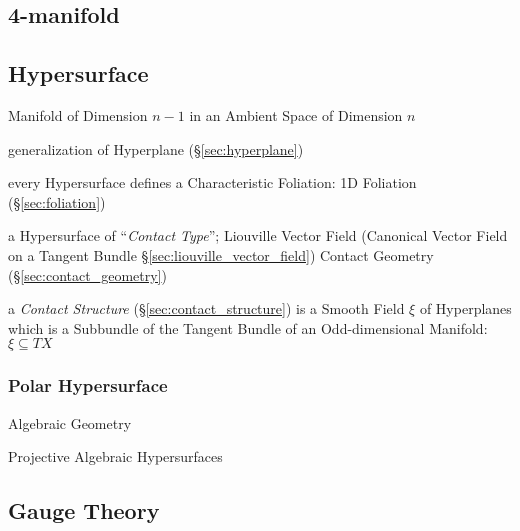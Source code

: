 \subsection{4-manifold}\label{sec:four_manifold}

\subsection{Hypersurface}\label{sec:hypersurface}


Manifold of Dimension $n-1$ in an Ambient Space of Dimension $n$

generalization of Hyperplane (\S\ref{sec:hyperplane})

every Hypersurface defines a Characteristic Foliation: 1D Foliation
(\S\ref{sec:foliation})

a Hypersurface of ``\emph{Contact Type}''; Liouville Vector Field (Canonical
Vector Field on a Tangent Bundle \S\ref{sec:liouville_vector_field}) \fist
Contact Geometry (\S\ref{sec:contact_geometry})

a \emph{Contact Structure} (\S\ref{sec:contact_structure}) is a Smooth Field
$\xi$ of Hyperplanes which is a Subbundle of the Tangent Bundle of an
Odd-dimensional Manifold: $\xi \subseteq T X$




\subsubsection{Polar Hypersurface}\label{sec:polar_hypersurface}

Algebraic Geometry

Projective Algebraic Hypersurfaces




\subsection{Gauge Theory}\label{sec:gauge_theory}

